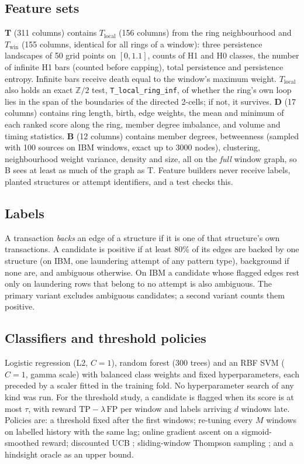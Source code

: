 \documentclass[conference]{IEEEtran}
\begin{document}
\subsection{Feature sets}
\textbf{T} (311 columns) contains $T_{\mathrm{local}}$ (156 columns) from the ring neighbourhood and $T_{\mathrm{win}}$ (155 columns, identical for all rings of a window): three persistence landscapes \cite{bubenik2015landscapes} of 50 grid points on $[0,1.1]$, counts of H1 and H0 classes, the number of infinite H1 bars (counted before capping), total persistence and persistence entropy. Infinite bars receive death equal to the window's maximum weight. $T_{\mathrm{local}}$ also holds an exact $\mathbb{Z}/2$ test, \texttt{T\_local\_ring\_inf}, of whether the ring's own loop lies in the span of the boundaries of the directed 2-cells; if not, it survives. \textbf{D} (17 columns) contains ring length, birth, edge weights, the mean and minimum of each ranked score along the ring, member degree imbalance, and volume and timing statistics. \textbf{B} (12 columns) contains member degrees, betweenness (sampled with 100 sources on IBM windows, exact up to 3000 nodes), clustering, neighbourhood weight variance, density and size, all on the \emph{full} window graph, so B sees at least as much of the graph as T. Feature builders never receive labels, planted structures or attempt identifiers, and a test checks this.

\subsection{Labels}
A transaction \emph{backs} an edge of a structure if it is one of that structure's own transactions. A candidate is positive if at least 80\% of its edges are backed by one structure (on IBM, one laundering attempt of any pattern type), background if none are, and ambiguous otherwise. On IBM a candidate whose flagged edges rest only on laundering rows that belong to no attempt is also ambiguous. The primary variant excludes ambiguous candidates; a second variant counts them positive.

\subsection{Classifiers and threshold policies}
Logistic regression (L2, $C=1$), random forest (300 trees) and an RBF SVM ($C=1$, gamma scale) with balanced class weights and fixed hyperparameters, each preceded by a scaler fitted in the training fold. No hyperparameter search of any kind was run. For the threshold study, a candidate is flagged when its score is at most $\tau$, with reward $\mathrm{TP}-\lambda\,\mathrm{FP}$ per window and labels arriving $d$ windows late. Policies are: a threshold fixed after the first windows; re-tuning every $M$ windows on labelled history with the same lag; online gradient ascent on a sigmoid-smoothed reward; discounted UCB \cite{garivier2011switching}; sliding-window Thompson sampling \cite{trovo2020swts}; and a hindsight oracle as an upper bound.
\end{document}
